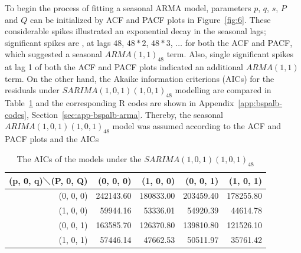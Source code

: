 \documentclass[12pt,msc]{uom_eee_dissertation_casson}
\newcommand{\figref}[1]{Figure~\ref{#1}}
\newcommand{\tabref}[1]{Table~\ref{#1}}
\newcommand{\secref}[1]{Section~\ref{#1}}
\newcommand{\appref}[1]{Appendix~\ref{#1}}
\begin{document}
To begin the process of fitting a seasonal ARMA model, parameters $p$, $q$, $s$, $P$ and $Q$ can be initialized by ACF and PACF plots in \figref{fig:6}. These considerable spikes illustrated an exponential decay in the seasonal lags; significant spikes are , at lags $48$, $48*2$, $48*3$, $\dots$ for both the ACF and PACF, which suggested a seasonal $ARMA(1,1)_{48}$ term. Also, single significant spikes at lag 1 of both the ACF and PACF plots indicated an additional $ARMA(1,1)$ term. On the other hand, the Akaike information criterions (AICs) for the residuals under $SARIMA(1,0,1)(1,0,1)_{48}$ modelling are compared in \tabref{table:3} and the corresponding R codes are shown in \appref{app:bspalb-codes}, \secref{sec:app-bspalb-arma}. Thereby, the seasonal $ARIMA(1,0,1)(1,0,1)_{48}$ model was assumed according to the ACF and PACF plots and the AICs
\begin{table}[H]
\centering
\begin{tabular}{| r | r | r | r | r | }
		\hline
		(p, 0, q)$\diagdown$(P, 0, Q) & (0, 0, 0) & (1, 0, 0) & (0, 0, 1) & (1, 0, 1) \\ \hline
		(0, 0, 0) & 242143.60 & 180833.00 & 203459.40 &  178255.80 \\ \hline
		(1, 0, 0) &  59944.16 &  53336.01 &  54920.39 &   44614.78 \\ \hline
		(0, 0, 1) & 163585.70 & 126370.80 & 139810.80 &  121526.10 \\ \hline
		(1, 0, 1) &  57446.14 &  47662.53 &  50511.97 &   35761.42\\ \hline
	\end{tabular}
\caption{The AICs of the models under the $SARIMA(1,0,1)(1,0,1)_{48}$
     }
	\label{table:3}
\end{table}
\end{document}
